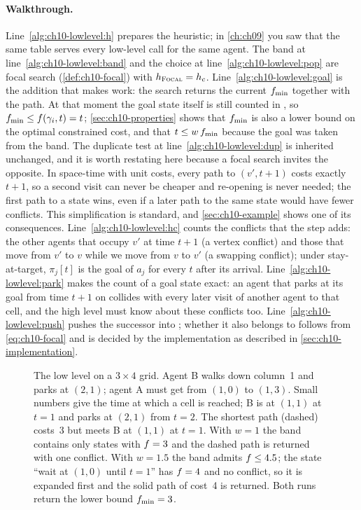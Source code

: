 \paragraph{Walkthrough.}
Line~\ref{alg:ch10-lowlevel:h} prepares the heuristic; in \cref{ch:ch09} you
saw that the same table serves every low-level call for the same agent. The band at line~\ref{alg:ch10-lowlevel:band} and the choice at
line~\ref{alg:ch10-lowlevel:pop} are focal search (\cref{def:ch10-focal}) with
$h_{\textsc{Focal}} = h_c$. Line~\ref{alg:ch10-lowlevel:goal} is the addition
that makes \ecbs work: the search returns the current $f_{\min}$ together
with the path. At that moment the goal state itself is still counted in
\Open, so $f_{\min} \le f(\gamma_i, t) = t$; \cref{sec:ch10-properties}
shows that $f_{\min}$ is also a lower bound on the optimal constrained
cost, and that $t \le w\,f_{\min}$ because the goal was taken from the
band. The duplicate test at line~\ref{alg:ch10-lowlevel:dup} is inherited unchanged, and it is
worth restating here because a focal search invites the opposite. In space-time
with unit costs, every path to $(v', t+1)$ costs exactly $t+1$, so a second
visit can never be cheaper and re-opening is never needed; the first path to
a state wins, even if a later path to the same state would have fewer
conflicts. This simplification is standard, and \cref{sec:ch10-example} shows
one of its consequences. Line~\ref{alg:ch10-lowlevel:hc} counts the conflicts
that the step adds: the other agents that occupy $v'$ at time $t+1$ (a vertex
conflict) and those that move from $v'$ to $v$ while we move from $v$ to $v'$
(a swapping conflict); under stay-at-target, $\pi_j[t]$ is the goal of $a_j$
for every $t$ after its arrival. Line~\ref{alg:ch10-lowlevel:park} makes the
count of a goal state exact: an agent that parks at its goal from time $t+1$
on collides with every later visit of another agent to that cell, and the high
level must know about these conflicts too. Line~\ref{alg:ch10-lowlevel:push}
pushes the successor into \Open; whether it also belongs to \Focal follows from
\cref{eq:ch10-focal} and is decided by the implementation as described in
\cref{sec:ch10-implementation}.

\begin{figure}[tb]
  \centering
  \caption{The low level on a $3 \times 4$ grid. Agent B walks down column~1
  and parks at $(2,1)$; agent A must get from $(1,0)$ to $(1,3)$. Small
  numbers give the time at which a cell is reached; B is at $(1,1)$ at
  $t = 1$ and parks at $(2,1)$ from $t = 2$. The
  shortest path (dashed) costs~3 but meets B at $(1,1)$ at $t = 1$. With
  $w = 1$ the band contains only states with $f = 3$ and the dashed path
  is returned with one conflict. With $w = 1.5$ the band admits
  $f \le 4.5$; the state ``wait at $(1,0)$ until $t = 1$'' has
  $f = 4$ and no conflict, so it is expanded first and the solid path of
  cost~4 is returned. Both runs return the lower bound $f_{\min} = 3$.}
  \label{fig:ch10-focal-lowlevel}
\end{figure}

